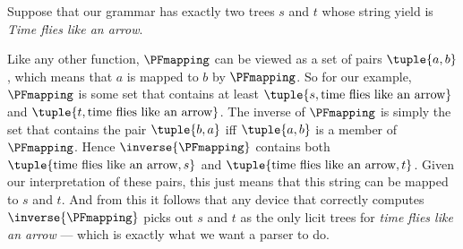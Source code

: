 \begin{examplebox}
    Suppose that our grammar has exactly two trees $s$ and $t$ whose string yield is \emph{Time flies like an arrow}.
    \begin{center}
        \hspace{2em}
    \end{center}
    Like any other function, $\PFmapping$ can be viewed as a set of pairs $\tuple{a,b}$, which means that $a$ is mapped to $b$ by $\PFmapping$.
    So for our example, $\PFmapping$ is some set that contains at least $\tuple{s,\text{time flies like an arrow}}$ and $\tuple{t,\text{time flies like an arrow}}$.
    The inverse of $\PFmapping$ is simply the set that contains the pair $\tuple{b,a}$ iff $\tuple{a,b}$ is a member of $\PFmapping$.
    Hence $\inverse{\PFmapping}$ contains both $\tuple{\text{time flies like an arrow},s}$ and $\tuple{\text{time flies like an arrow},t}$.
    Given our interpretation of these pairs, this just means that this string can be mapped to $s$ and $t$.
    And from this it follows that any device that correctly computes $\inverse{\PFmapping}$ picks out $s$ and $t$ as the only licit trees for \emph{time flies like an arrow} --- which is exactly what we want a parser to do.
\end{examplebox}

